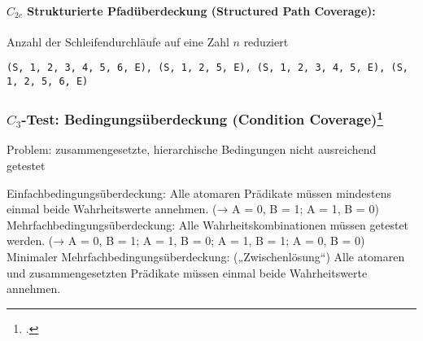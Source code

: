 \documentclass{bschlangaul-theorie}
\begin{document}
%

\paragraph{$C_{2c}$ Strukturierte Pfadüberdeckung (Structured Path Coverage):}

\noindent
Anzahl der Schleifendurchläufe auf eine
Zahl $n$ reduziert


\texttt{(S, 1, 2, 3, 4, 5, 6, E), (S, 1, 2, 5, E),
(S, 1, 2, 3, 4, 5, E), (S, 1, 2, 5, 6, E)}

%

\subsubsection{$C_3$-Test: Bedingungsüberdeckung (Condition Coverage)\footcite[Seite 40]{sosy:fs:5}}

Problem: zusammengesetzte, hierarchische Bedingungen nicht ausreichend
getestet

Einfachbedingungsüberdeckung:
Alle atomaren Prädikate müssen mindestens einmal beide Wahrheitswerte
annehmen.
(→ A = 0, B = 1; A = 1, B = 0)
Mehrfachbedingungsüberdeckung:
Alle Wahrheitskombinationen müssen getestet werden.
(→ A = 0, B = 1; A = 1, B = 0; A = 1, B = 1; A = 0, B = 0)
Minimaler Mehrfachbedingungsüberdeckung: („Zwischenlösung“)
Alle atomaren und zusammengesetzten Prädikate müssen einmal beide
Wahrheitswerte annehmen.
\end{document}
